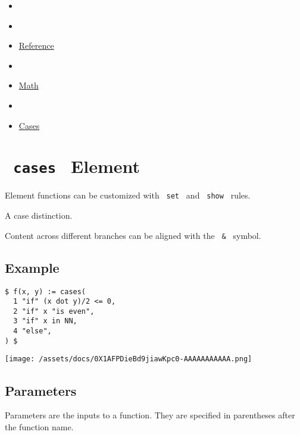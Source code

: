 \begin{itemize}
\tightlist
\item
  \href{/docs}{}
\item
  
\item
  \href{/docs/reference/}{Reference}
\item
  
\item
  \href{/docs/reference/math/}{Math}
\item
  
\item
  \href{/docs/reference/math/cases/}{Cases}
\end{itemize}

\section{\texorpdfstring{\texttt{\ cases\ } {{ Element
}}}{ cases   Element }}\label{summary}

\label{element-tooltip}
Element functions can be customized with \texttt{\ set\ } and
\texttt{\ show\ } rules.

A case distinction.

Content across different branches can be aligned with the
\texttt{\ \&\ } symbol.

\subsection{Example}\label{example}

\begin{verbatim}
$ f(x, y) := cases(
  1 "if" (x dot y)/2 <= 0,
  2 "if" x "is even",
  3 "if" x in NN,
  4 "else",
) $
\end{verbatim}

\texttt{[image: /assets/docs/0X1AFPDieBd9jiawKpc0-AAAAAAAAAAA.png]}

\subsection{\texorpdfstring{{ Parameters
}}{ Parameters }}\label{parameters}

\label{parameters-tooltip}
Parameters are the inputs to a function. They are specified in
parentheses after the function name.


